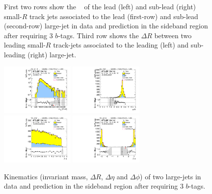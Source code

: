 \begin{figure}[htbp!]
\begin{center}
  \caption{First two rows show the \pt~ of the lead (left) and sub-lead (right) small-$R$ track jets associated to the lead (first-row) and sub-lead (second-row) large-\R jet in data and prediction in the sideband region after requiring 3 $b$-tags. Third row shows the $\Delta R$ between two leading small-$R$ track-jets associated to the leading (left) and sub-leading (right) large-\R jet. }
  \label{fig:boosted-3b-sideband-ak2}
\end{center}
\end{figure}


\begin{figure}[htbp!]
\begin{center}
\includegraphics[width=0.32\textwidth,angle=-90]{figures/boosted/Sideband/b77_ThreeTag_Sideband_mHH_l_1.pdf}
\includegraphics[width=0.32\textwidth,angle=-90]{figures/boosted/Sideband/b77_ThreeTag_Sideband_hCandDr.pdf}\\
\includegraphics[width=0.32\textwidth,angle=-90]{figures/boosted/Sideband/b77_ThreeTag_Sideband_hCandDeta.pdf}
\includegraphics[width=0.32\textwidth,angle=-90]{figures/boosted/Sideband/b77_ThreeTag_Sideband_hCandDphi.pdf}
  \caption{Kinematics (invariant mass, $\Delta R$, $\Delta \eta$ and $\Delta \phi$) of two large-\R jets in data and prediction in the sideband region after requiring 3 $b$-tags. }
  \label{fig:boosted-3b-sideband-ak10-system}
\end{center}
\end{figure}

